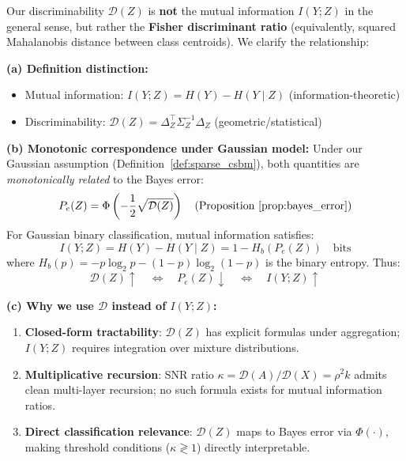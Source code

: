 \begin{remark}
\label{rem:discriminability_vs_mi}
Our discriminability $\mathcal{D}(Z)$ is \textbf{not} the mutual information $I(Y; Z)$ in the general sense, but rather the \textbf{Fisher discriminant ratio} (equivalently, squared Mahalanobis distance between class centroids). We clarify the relationship:

\textbf{(a) Definition distinction:}
\begin{itemize}
    \item Mutual information: $I(Y; Z) = H(Y) - H(Y \mid Z)$ (information-theoretic)
    \item Discriminability: $\mathcal{D}(Z) = \Delta_Z^\top \Sigma_Z^{-1} \Delta_Z$ (geometric/statistical)
\end{itemize}

\textbf{(b) Monotonic correspondence under Gaussian model:}
Under our Gaussian assumption (Definition~\ref{def:sparse_csbm}), both quantities are \textit{monotonically related} to the Bayes error:
\begin{equation}
    P_e(Z) = \Phi\left(-\frac{1}{2}\sqrt{\mathcal{D}(Z)}\right) \quad \text{(Proposition~\ref{prop:bayes_error})}
\end{equation}
For Gaussian binary classification, mutual information satisfies:
\begin{equation}
    I(Y; Z) = H(Y) - H(Y \mid Z) = 1 - H_b(P_e(Z)) \quad \text{bits}
\end{equation}
where $H_b(p) = -p\log_2 p - (1-p)\log_2(1-p)$ is the binary entropy. Thus:
\begin{equation}
    \mathcal{D}(Z) \uparrow \quad \Leftrightarrow \quad P_e(Z) \downarrow \quad \Leftrightarrow \quad I(Y; Z) \uparrow
\end{equation}

\textbf{(c) Why we use $\mathcal{D}$ instead of $I(Y;Z)$:}
\begin{enumerate}
    \item \textbf{Closed-form tractability}: $\mathcal{D}(Z)$ has explicit formulas under aggregation; $I(Y;Z)$ requires integration over mixture distributions.
    \item \textbf{Multiplicative recursion}: SNR ratio $\kappa = \mathcal{D}(A)/\mathcal{D}(X) = \rho^2 k$ admits clean multi-layer recursion; no such formula exists for mutual information ratios.
    \item \textbf{Direct classification relevance}: $\mathcal{D}(Z)$ maps to Bayes error via $\Phi(\cdot)$, making threshold conditions ($\kappa \gtrless 1$) directly interpretable.
\end{enumerate}


\end{remark}
